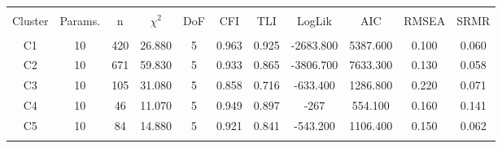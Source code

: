 
\begin{table}[!htbp] \centering 
  \caption{} 
  \label{struc_model_fit_clust_stats} 
\begin{tabular}{@{\extracolsep{0pt}} ccccccccccc} 
\\[-1.8ex]\hline 
\hline \\[-1.8ex] 
{Cluster} & {Params.} & {n} & {$\chi^{2}$} & {DoF} & {CFI} & {TLI} & {LogLik} & {AIC} & {RMSEA} & {SRMR} \\
\hline \\[-1.8ex] 
C1 & 10 & 420 & 26.880 & 5 & 0.963 & 0.925 & -2683.800 & 5387.600 & 0.100 & 0.060 \\ 
C2 & 10 & 671 & 59.830 & 5 & 0.933 & 0.865 & -3806.700 & 7633.300 & 0.130 & 0.058 \\ 
C3 & 10 & 105 & 31.080 & 5 & 0.858 & 0.716 & -633.400 & 1286.800 & 0.220 & 0.071 \\ 
C4 & 10 & 46 & 11.070 & 5 & 0.949 & 0.897 & -267 & 554.100 & 0.160 & 0.141 \\ 
C5 & 10 & 84 & 14.880 & 5 & 0.921 & 0.841 & -543.200 & 1106.400 & 0.150 & 0.062 \\ 
\hline \\[-1.8ex] 
\end{tabular} 
\end{table} 
